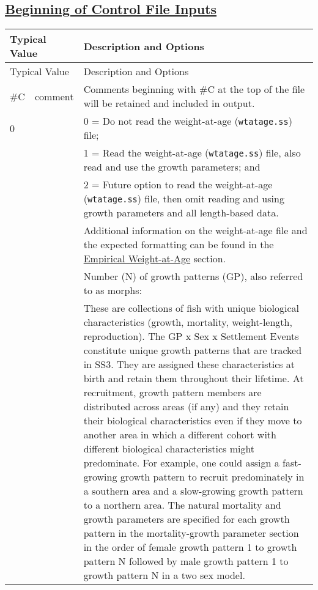 \subsection[Beginning of Control File Inputs]{\protect\hyperlink{ControlInputs}{Beginning of Control File Inputs}}
\begin{center}
	\begin{longtable}{p{0.5cm} p{2cm} p{12.5cm}}
		\hline
		\multicolumn{2}{l}{Typical Value} & Description and Options \Tstrut\Bstrut\\
		\hline
		\endfirsthead

		\hline
		\multicolumn{2}{l}{Typical Value} & Description and Options \Tstrut\Bstrut\\
		\hline
		\endhead

		\hline
		\endfoot

		\endlastfoot

		\#C \Tstrut & comment & Comments beginning with \#C at the top of the file will be retained and included in output. \Bstrut\\
		\hline

		0 & & 0 = Do not read the weight-at-age (\texttt{wtatage.ss}) file; \Tstrut\\
		  & & 1 = Read the weight-at-age (\texttt{wtatage.ss}) file, also read and use the growth parameters; and \\
		  & & 2 = Future option to read the weight-at-age (\texttt{wtatage.ss}) file, then omit reading and using growth parameters and all length-based data. \\
		  & & Additional information on the weight-at-age file and the expected formatting can be found in the \hyperlink{WAA}{Empirical Weight-at-Age} section. \Bstrut\\

		\pagebreak
		1 & & Number (N) of growth patterns (GP), also referred to as morphs: \Tstrut\\
		& & These are collections of fish with unique biological characteristics (growth, mortality, weight-length, reproduction). The GP x Sex x Settlement Events constitute unique growth patterns that are tracked in SS3. They are assigned these characteristics at birth and retain them throughout their lifetime. At recruitment, growth pattern members are distributed across areas (if any) and they retain their biological characteristics even if they move to another area in which a different cohort with different biological characteristics might predominate. For example, one could assign a fast-growing growth pattern to recruit predominately in a southern area and a slow-growing growth pattern to a northern area. The natural mortality and growth parameters are specified for each growth pattern in the mortality-growth parameter section in the order of female growth pattern 1 to growth pattern N followed by male growth pattern 1 to growth pattern N in a two sex model. \Bstrut\\


\end{longtable}
\end{center}
